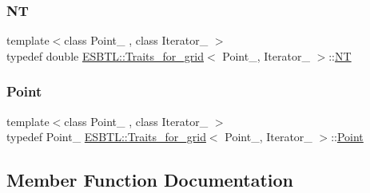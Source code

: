 \subsubsection{\texorpdfstring{NT}{NT}}
{\footnotesize\ttfamily template$<$class Point\+\_\+ , class Iterator\+\_\+ $>$ \\
typedef double \hyperlink{structESBTL_1_1Traits__for__grid}{E\+S\+B\+T\+L\+::\+Traits\+\_\+for\+\_\+grid}$<$ Point\+\_\+, Iterator\+\_\+ $>$\+::\hyperlink{structESBTL_1_1Traits__for__grid_a2d1eddf80f02f912cd39b58c9356dd83}{NT}}

\mbox{\label{structESBTL_1_1Traits__for__grid_a9e1fa4c89963d77117ce5eaead5ce7a1}} 
\subsubsection{\texorpdfstring{Point}{Point}}
{\footnotesize\ttfamily template$<$class Point\+\_\+ , class Iterator\+\_\+ $>$ \\
typedef Point\+\_\+ \hyperlink{structESBTL_1_1Traits__for__grid}{E\+S\+B\+T\+L\+::\+Traits\+\_\+for\+\_\+grid}$<$ Point\+\_\+, Iterator\+\_\+ $>$\+::\hyperlink{structESBTL_1_1Traits__for__grid_a9e1fa4c89963d77117ce5eaead5ce7a1}{Point}}



\subsection{Member Function Documentation}
\mbox{\label{structESBTL_1_1Traits__for__grid_a6456ed3dd1cba28aa5081f4fd2270880}} 
